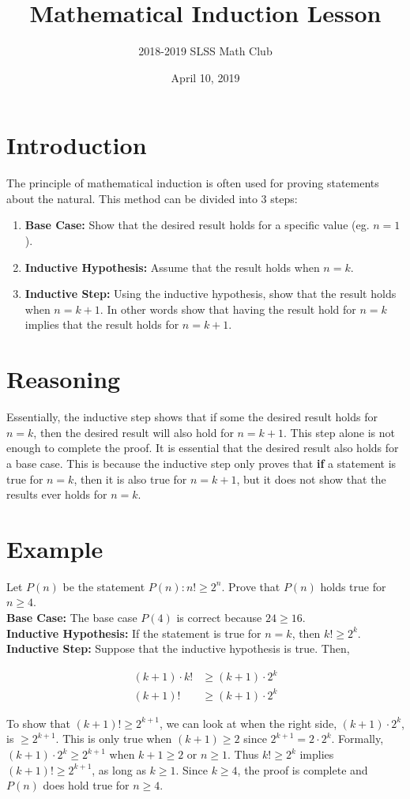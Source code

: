 \documentclass[12pt]{article}
\title{Mathematical Induction Lesson\vspace{-3mm}}
\author{2018-2019 SLSS Math Club\vspace{-5mm}}
\date{April 10, 2019\vspace{-5mm}}
\begin{document}
\maketitle

\section{Introduction}
The principle of mathematical induction is often used for proving statements about the natural. This method can be divided into 3 steps:
\begin{enumerate}
   \item \textbf{Base Case:} Show that the desired result holds for a specific value (eg. $n = 1$).
   \item \textbf{Inductive Hypothesis:} Assume that the result holds when $n = k$.
   \item \textbf{Inductive Step:} Using the inductive hypothesis, show that the result holds when $n = k + 1$. In other words show that having the result hold for $n = k$ implies that the result holds for $n = k + 1$.
\end{enumerate}

\section{Reasoning}
Essentially, the inductive step shows that if some the desired result holds for $n = k$, then the desired result will also hold for $n = k + 1$. This step alone is not enough to complete the proof. It is essential that the desired result also holds for a base case. This is because the inductive step only proves that \textbf{if} a statement is true for $n = k$, then it is also true for $n = k + 1$, but it does not show that the results ever holds for $n = k$.

\section{Example}
Let $P(n)$ be the statement $P(n): n! \ge 2^n$. Prove that $P(n)$ holds true for $n \ge 4$. \\

\textbf{Base Case:} The base case $P(4)$ is correct because $24 \ge 16$. \\

\textbf{Inductive Hypothesis:} If the statement is true for $n = k$, then $k! \ge 2^k$. \\

\textbf{Inductive Step:} Suppose that the inductive hypothesis is true. Then,

\begin{align*}
    (k+1) \cdot k! &\ge (k+1) \cdot 2^k \\
    (k+1)! &\ge (k+1) \cdot 2^k
\end{align*}

To show that $(k+1)! \ge 2^{k+1}$, we can look at when the right side, $(k+1) \cdot 2^k$, is $\ge 2^{k+1}$. This is only true when $(k+1) \ge 2$ since $2^{k+1} = 2 \cdot 2^k$. Formally, $(k+1) \cdot 2^k \ge 2^{k+1}$ when $k+1 \ge 2$ or $n \ge 1$. Thus $k! \ge 2^k$ implies $(k+1)! \ge 2^{k+1}$, as long as $k \ge 1$. Since $k \ge 4$, the proof is complete and $P(n)$ does hold true for $n \ge 4$.
\end{document}
